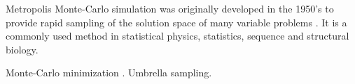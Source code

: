 Metropolis Monte-Carlo simulation was originally developed in the 1950's to provide rapid sampling of the solution space of many variable problems \cite{metropolis1953equation}.
\cite{hastings1970monte}
It is a commonly used method in statistical physics, statistics, sequence and structural biology.

Monte-Carlo minimization  \cite{li1987monte}.
Umbrella sampling\cite{torrie1977nonphysical}.
